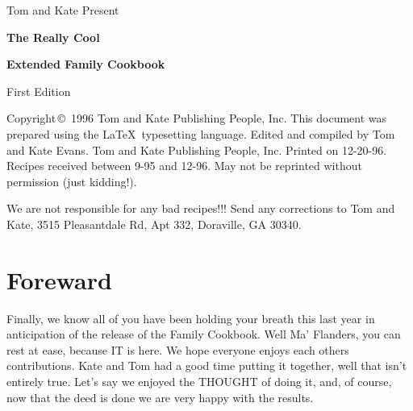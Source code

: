 \documentclass[12pt]{book}
\begin{document}
\frontmatter
\begin{titlepage}
\vspace*{1.5in}
\begin{center}
\begin{LARGE}
Tom and Kate Present\\
\end{LARGE}
\begin{huge}
\vspace{2\baselineskip}
{\bf The Really Cool}\\
\end{huge}
\begin{Huge}
\vspace{2\baselineskip}
{\bf Extended Family Cookbook}\\
\end{Huge}
\begin{LARGE}
\vspace{3\baselineskip}
First Edition
\end{LARGE}
\end{center}
\end{titlepage}

\vspace*{\fill}
Copyright\,\copyright\, 1996 Tom and Kate Publishing People, Inc.
This document was prepared using the \LaTeX\ typesetting language.
Edited and compiled by Tom and Kate Evans.  Tom and Kate Publishing
People, Inc.
Printed on 12-20-96.  Recipes  received between 9-95 and
12-96.
May not be reprinted without permission (just kidding!).  

\vspace{1\baselineskip}
We are not
responsible for any bad recipes!!!  Send any corrections to Tom and
Kate, 3515 Pleasantdale Rd, Apt 332, Doraville, GA  30340.
\pagebreak

\pagestyle{headings}
\tableofcontents

\chapter{Foreward}

Finally, we know all of you have been holding your breath this last year
in anticipation of the release of the Family Cookbook.  Well Ma'
Flanders, you can rest at ease, because IT is here.  We hope everyone
enjoys each others contributions.  Kate and Tom had a good time putting it
together, well that isn't entirely true.  Let's say we enjoyed the
THOUGHT of doing it, and, of course, now that the deed is done we are
very happy with the results.  
\end{document}
